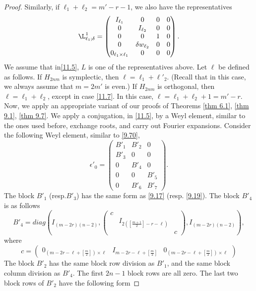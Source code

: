 \documentclass[12pts]{amsart}
\begin{document}
\begin{proof}
Similarly, if $\ell_1+\ell_2=m'-r-1$, we also have the representatives	 
 \begin{equation}\label{11.7}
 \L_{\ell_1;\delta}^1=\begin{pmatrix}I_{\ell_1}&0&0&0\\0&I_{\ell_2}&0&0\\0&0&1&0\\0&\delta w_{\ell_2}&0&0\\0_{\ell_1\times \ell_1}&0&0&0\end{pmatrix}.
 \end{equation}
 We assume that in\eqref{11.5}, $L$ is one of the representatives above.
 Let $\ell$ be defined as follows. If $H_{2nm}$ is symplectic, then $\ell=\ell_1+\ell'_2$. (Recall that in this case, we always assume that $m=2m'$ is even.) If $H_{2nm}$ is orthogonal, then $\ell=\ell_1+\ell_2$, except in case \eqref{11.7}. In this case, $\ell=\ell_1+\ell_2+1=m'-r$. 
Now, we apply an appropriate variant of our proofs of Theorems  \ref{thm 6.1}, \ref{thm 9.1}, \ref{thm 9.7}. We apply a conjugation, in \eqref{11.5}, by a Weyl element, similar to the ones used before, exchange roots, and carry out Fourier expansions. Consider the following Weyl element, similar to \eqref{9.70},	
\begin{equation}\label{11.8}
\epsilon'_0=\begin{pmatrix}B'_1&B'_2&0\\B'_3&0&0\\0&B'_4&0\\0&0&B'_5\\0&B'_6&B'_7\end{pmatrix}.
\end{equation}
The block $B'_1$ (resp.$B'_3$) has the same form as \eqref{9.17} (resp. \eqref{9.19}). The block $B'_4$ is as follows
\begin{equation}\label{11.9}
B'_4=diag(I_{(m-2r)(n-2)},\begin{pmatrix}c\\&I_{2([\frac{m+1}{2}]-r-\ell)}\\&&c\end{pmatrix},I_{(m-2r)(n-2)}),
\end{equation}
where 
$$
c=\begin{pmatrix}0_{(m-2r-\ell+[\frac{m}{2}])\times \ell}&I_{m-2r-\ell+[\frac{m}{2}]}&0_{(m-2r-\ell+[\frac{m}{2}])\times \ell}\end{pmatrix}
$$
The block $B'_2$ has the same block row division as $B'_1$, and the same block column division as $B'_4$. The first $2n-1$ block rows are all zero. The last two block rows of $B'_2$ have the following form

\end{proof}
\end{document}
